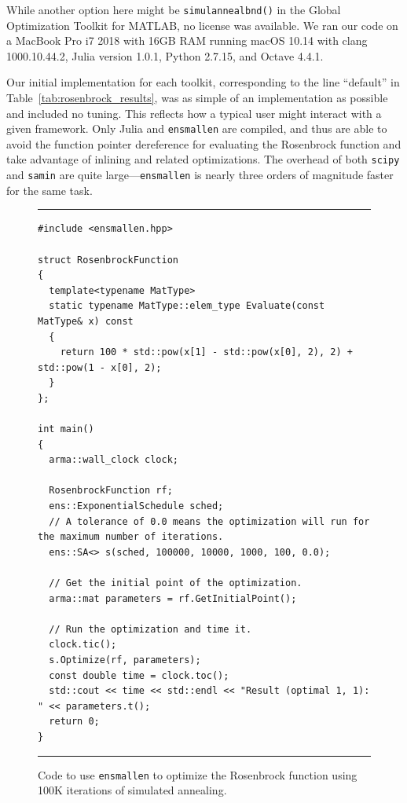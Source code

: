 While another option here might be {\tt simulannealbnd()}
in the Global Optimization Toolkit for MATLAB,
no license was available.
We ran our code on a MacBook Pro i7 2018 with 16GB RAM running macOS 10.14 with clang 1000.10.44.2, Julia version 1.0.1, Python 2.7.15, and Octave 4.4.1.

Our initial implementation for each toolkit, corresponding to the line
``default'' in Table~\ref{tab:rosenbrock_results}, was as simple of an
implementation as possible and included no tuning.  This reflects how a typical
user might interact with a given framework.  Only Julia and {\tt ensmallen} are
compiled, and thus are able to avoid the function pointer dereference for
evaluating the Rosenbrock function and take advantage of inlining and related
optimizations.  The overhead of both {\tt scipy} and {\tt samin} are quite
large---{\tt ensmallen} is nearly three orders of magnitude faster for the same
task.

\begin{figure}[b!]
\hrule
\vspace{1ex}
\begin{verbatim}
#include <ensmallen.hpp>

struct RosenbrockFunction
{
  template<typename MatType>
  static typename MatType::elem_type Evaluate(const MatType& x) const
  {
    return 100 * std::pow(x[1] - std::pow(x[0], 2), 2) + std::pow(1 - x[0], 2);
  }
};

int main()
{
  arma::wall_clock clock;

  RosenbrockFunction rf;
  ens::ExponentialSchedule sched;
  // A tolerance of 0.0 means the optimization will run for the maximum number of iterations.
  ens::SA<> s(sched, 100000, 10000, 1000, 100, 0.0);

  // Get the initial point of the optimization.
  arma::mat parameters = rf.GetInitialPoint();

  // Run the optimization and time it.
  clock.tic();
  s.Optimize(rf, parameters);
  const double time = clock.toc();
  std::cout << time << std::endl << "Result (optimal 1, 1): " << parameters.t();
  return 0;
}
\end{verbatim}
\hrule
\vspace*{-0.5em}
\caption{Code to use {\tt ensmallen} to optimize the Rosenbrock function using
100K iterations of simulated annealing.}
\label{fig:rosenbrock_run}
\end{figure}

